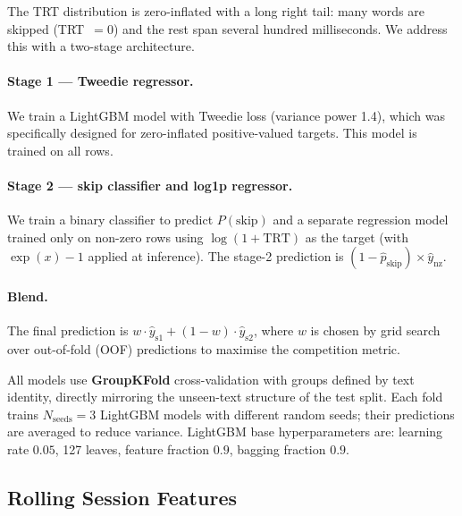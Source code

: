 \documentclass[12pt]{article}
\begin{document}
The TRT distribution is zero-inflated with a long right tail: many words are skipped (TRT~$=0$) and the rest span several hundred milliseconds. We address this with a two-stage architecture.

\paragraph{Stage 1 — Tweedie regressor.}
We train a LightGBM model \cite{ke2017lightgbm} with Tweedie loss (variance power 1.4), which was specifically designed for zero-inflated positive-valued targets. This model is trained on all rows.

\paragraph{Stage 2 — skip classifier and log1p regressor.}
We train a binary classifier to predict $P(\text{skip})$ and a separate regression model trained only on non-zero rows using $\log(1 + \text{TRT})$ as the target (with $\exp(x)-1$ applied at inference). The stage-2 prediction is $(1 - \hat{p}_{\text{skip}}) \times \hat{y}_{\text{nz}}$.

\paragraph{Blend.}
The final prediction is $w \cdot \hat{y}_{\text{s1}} + (1-w) \cdot \hat{y}_{\text{s2}}$, where $w$ is chosen by grid search over out-of-fold (OOF) predictions to maximise the competition metric.

All models use \textbf{GroupKFold} cross-validation with groups defined by text identity, directly mirroring the unseen-text structure of the test split. Each fold trains $N_{\text{seeds}} = 3$ LightGBM models with different random seeds; their predictions are averaged to reduce variance. LightGBM base hyperparameters are: learning rate $0.05$, 127 leaves, feature fraction $0.9$, bagging fraction $0.9$.

\subsection{Rolling Session Features}
\label{sec:rolling}
\end{document}
